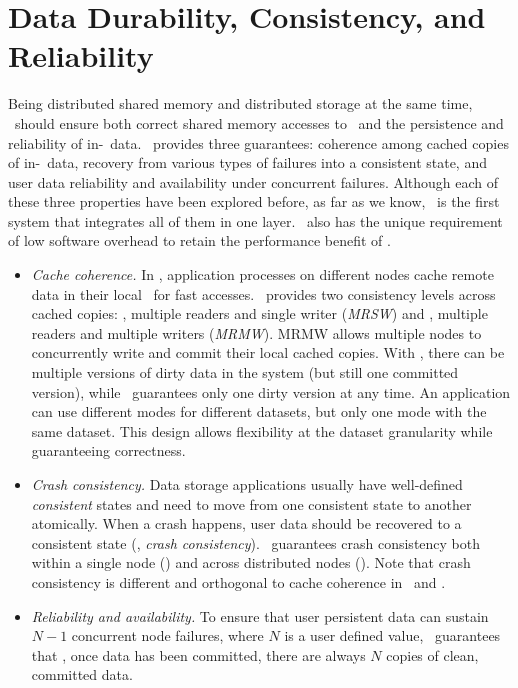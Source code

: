 \section{Data Durability, Consistency, and Reliability}
\label{sec:xact}

Being distributed shared memory and distributed storage at the same time,
\dsnvm\ should ensure both correct shared memory accesses to \nvm\
and the persistence and reliability of in-\nvm\ data. 
\hotpot\ provides three guarantees: coherence among cached copies of in-\nvm\ data,
recovery from various types of failures into a consistent state,
and user data reliability and availability under concurrent failures.
Although each of these three properties have been explored before,
as far as we know, \hotpot\ is the first system that integrates all of them in one layer.
\hotpot\ also has the unique requirement of low software overhead to retain the performance benefit of \nvm.

\begin{itemize}[leftmargin=*]
\item{\em Cache coherence.} 
In \hotpot, application processes on different nodes cache remote data in their local \nvm\ for fast accesses.
\hotpot\ provides two consistency levels across cached copies: 
{\em \ra}, multiple readers and single writer ({\em MRSW}) 
and {\em \rb}, multiple readers and multiple writers ({\em MRMW}).
MRMW allows multiple nodes to concurrently write and commit their local cached copies.
With \mrmw, there can be multiple versions of dirty data in the system (but still one committed version),
while \mrsw\ guarantees only one dirty version at any time.
An application can use different modes for different datasets,
but only one mode with the same dataset.
This design allows flexibility at the dataset granularity while guaranteeing correctness.
 
\item{\em Crash consistency.} 
Data storage applications usually have well-defined {\em consistent} states and need to move from 
one consistent state to another atomically.
When a crash happens, 
user data should be recovered to a consistent state ({\ie, \em crash consistency}). 
\hotpot\ guarantees crash consistency both within a single node ({\em \rcs}) and across distributed nodes ({\em \rcm}).
Note that crash consistency is different and orthogonal to cache
coherence in \ra\ and \rb. 

\item{\em Reliability and availability.} 
To ensure that user persistent data can sustain $N-1$ concurrent node failures, 
where $N$ is a user defined value, \hotpot\ guarantees that {\em \re}, once data has 
been committed, there are always $N$ copies of clean, committed data.

\end{itemize}

